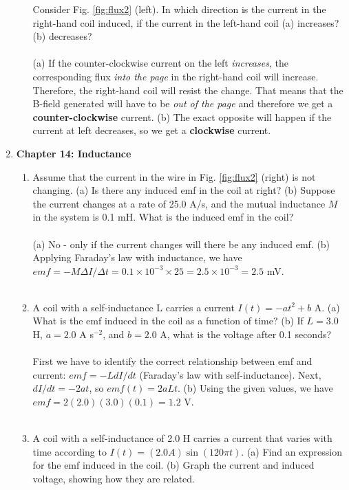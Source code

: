 \documentclass[10pt]{article}
\begin{document}
\begin{enumerate}
\begin{enumerate}
\begin{figure}
\end{figure}
Consider Fig. \ref{fig:flux2} (left).  In which direction is the current in the right-hand coil induced, if the current in the left-hand coil (a) increases?  (b) decreases? \\ \\
(a) If the counter-clockwise current on the left \textit{increases}, the corresponding flux \textit{into the page} in the right-hand coil  will increase.  Therefore, the right-hand coil will resist the change.  That means that the B-field generated will have to be \textit{out of the page} and therefore we get a \textbf{counter-clockwise} current.  (b) The exact opposite will happen if the current at left decreases, so we get a \textbf{clockwise} current.
\end{enumerate}
\item \textbf{Chapter 14: Inductance}
\begin{enumerate}
\item Assume that the current in the wire in Fig. \ref{fig:flux2} (right) is not changing.  (a) Is there any induced emf in the coil at right? (b) Suppose the current changes at a rate of 25.0 A/s, and the mutual inductance $M$ in the system is 0.1 mH.  What is the induced emf in the coil? \\ \\
(a) No - only if the current changes will there be any induced emf. (b) Applying Faraday's law with inductance, we have $emf = -M\Delta I/\Delta t = 0.1 \times 10^{-3} \times 25 = 2.5 \times 10^{-3} = 2.5$ mV. \\ \\
\item A coil with a self-inductance L carries a current $I(t) = -a t^2 + b$ A.  (a) What is the emf induced in the coil as a function of time? (b) If $L = 3.0$ H, $a = 2.0$ A s$^{-2}$, and $b = 2.0$ A, what is the voltage after 0.1 seconds? \\ \\
First we have to identify the correct relationship between emf and current: $emf = -L dI/dt$ (Faraday's law with self-inductance).  Next, $dI/dt = -2 a t$, so $emf(t) = 2 a L t$. (b) Using the given values, we have $emf = 2(2.0)(3.0)(0.1) = 1.2$ V. \\ \\
\item A coil with a self-inductance of 2.0 H carries a current that varies with time according to $I(t) = (2.0 A)\sin(120\pi t)$. (a) Find an expression for the emf induced in the coil. (b) Graph the current and induced voltage, showing how they are related. \\ \\

\end{enumerate}
\end{enumerate}
\end{document}
